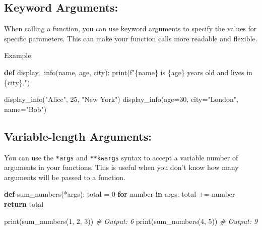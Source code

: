 \documentclass[
  paper=a4,
  ,captions=tableheading
]{scrartcl}
\newenvironment{Shaded}{}{}
\newcommand{\BuiltInTok}[1]{\textcolor[rgb]{0.00,0.50,0.00}{#1}}
\newcommand{\CommentTok}[1]{\textcolor[rgb]{0.38,0.63,0.69}{\textit{#1}}}
\newcommand{\ControlFlowTok}[1]{\textcolor[rgb]{0.00,0.44,0.13}{\textbf{#1}}}
\newcommand{\DecValTok}[1]{\textcolor[rgb]{0.25,0.63,0.44}{#1}}
\newcommand{\KeywordTok}[1]{\textcolor[rgb]{0.00,0.44,0.13}{\textbf{#1}}}
\newcommand{\NormalTok}[1]{#1}
\newcommand{\OperatorTok}[1]{\textcolor[rgb]{0.40,0.40,0.40}{#1}}
\newcommand{\SpecialCharTok}[1]{\textcolor[rgb]{0.25,0.44,0.63}{#1}}
\newcommand{\SpecialStringTok}[1]{\textcolor[rgb]{0.73,0.40,0.53}{#1}}
\newcommand{\StringTok}[1]{\textcolor[rgb]{0.25,0.44,0.63}{#1}}
\begin{document}
\hypertarget{keyword-arguments}{%
\subsection{Keyword Arguments:}\label{keyword-arguments}}

When calling a function, you can use keyword arguments to specify the
values for specific parameters. This can make your function calls more
readable and flexible.

Example:

\begin{Shaded}
\begin{Highlighting}[]
\KeywordTok{def}\NormalTok{ display\_info(name, age, city):}
    \BuiltInTok{print}\NormalTok{(}\SpecialStringTok{f"}\SpecialCharTok{\{}\NormalTok{name}\SpecialCharTok{\}}\SpecialStringTok{ is }\SpecialCharTok{\{}\NormalTok{age}\SpecialCharTok{\}}\SpecialStringTok{ years old and lives in }\SpecialCharTok{\{}\NormalTok{city}\SpecialCharTok{\}}\SpecialStringTok{."}\NormalTok{)}

\NormalTok{display\_info(}\StringTok{"Alice"}\NormalTok{, }\DecValTok{25}\NormalTok{, }\StringTok{"New York"}\NormalTok{)}
\NormalTok{display\_info(age}\OperatorTok{=}\DecValTok{30}\NormalTok{, city}\OperatorTok{=}\StringTok{"London"}\NormalTok{, name}\OperatorTok{=}\StringTok{"Bob"}\NormalTok{)}
\end{Highlighting}
\end{Shaded}

\hypertarget{variable-length-arguments}{%
\subsection{Variable-length
Arguments:}\label{variable-length-arguments}}

You can use the \texttt{*args} and \texttt{**kwargs} syntax to accept a
variable number of arguments in your functions. This is useful when you
don't know how many arguments will be passed to a function.

\begin{Shaded}
\begin{Highlighting}[]
\KeywordTok{def}\NormalTok{ sum\_numbers(}\OperatorTok{*}\NormalTok{args):}
\NormalTok{    total }\OperatorTok{=} \DecValTok{0}
    \ControlFlowTok{for}\NormalTok{ number }\KeywordTok{in}\NormalTok{ args:}
\NormalTok{        total }\OperatorTok{+=}\NormalTok{ number}
    \ControlFlowTok{return}\NormalTok{ total}

\BuiltInTok{print}\NormalTok{(sum\_numbers(}\DecValTok{1}\NormalTok{, }\DecValTok{2}\NormalTok{, }\DecValTok{3}\NormalTok{))  }\CommentTok{\# Output: 6}
\BuiltInTok{print}\NormalTok{(sum\_numbers(}\DecValTok{4}\NormalTok{, }\DecValTok{5}\NormalTok{))  }\CommentTok{\# Output: 9}
\end{Highlighting}
\end{Shaded}
\end{document}
